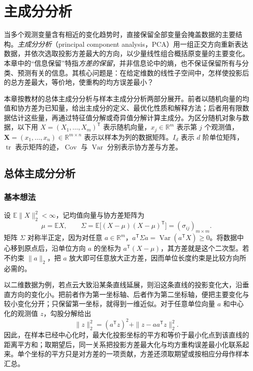\setcounter{chapter}{15} %
\chapter{主成分分析}
\label{ch:lh-pca}

当多个观测变量含有相近的变化趋势时，直接保留全部变量会掩盖数据的主要结构。\emph{主成分分析}（principal component analysis，PCA）用一组正交方向重新表达数据，并依次选取投影方差最大的方向，以少量线性组合概括原变量的主要变化。本章中的“信息保留”特指\emph{方差的保留}，并非信息论中的熵，也不保证保留所有与分类、预测有关的信息。其核心问题是：在给定维数的线性子空间中，怎样使投影后的总方差最大，等价地，使重构的均方误差最小？

本章按教材的总体主成分分析与样本主成分分析两部分展开。前者以随机向量的均值和协方差为已知量，给出主成分的定义、最优化性质和解释方法；后者用有限数据估计这些量，再通过特征值分解或奇异值分解计算主成分。为区分随机对象与数据，以下用 $X=(X_1,\ldots,X_m)^{\mathsf T}$ 表示随机向量，$x_j\in\mathbb R^m$ 表示第 $j$ 个观测值，$\mathbf X=(x_1,\ldots,x_n)\in\mathbb R^{m\times n}$ 表示以样本为列的数据矩阵。$I_d$ 表示 $d$ 阶单位矩阵，$\operatorname{tr}$ 表示矩阵的迹，$\operatorname{Cov}$ 与 $\operatorname{Var}$ 分别表示协方差与方差。

\section{总体主成分分析}
\label{sec:lh-pca-population}

\subsection{基本想法}
\label{subsec:lh-pca-idea}

设 $\mathbb E\|X\|_2^2<\infty$，记均值向量与协方差矩阵为
\begin{equation}
\mu=\mathbb E X,\qquad
\Sigma=\mathbb E\bigl[(X-\mu)(X-\mu)^{\mathsf T}\bigr]
=(\sigma_{ij})_{m\times m}.
\label{eq:lh-pca-population-cov}
\end{equation}
矩阵 $\Sigma$ 对称半正定，因为对任意 $a\in\mathbb R^m$，$a^{\mathsf T}\Sigma a=\operatorname{Var}(a^{\mathsf T}X)\geq0$。将数据中心移到原点后，沿单位方向 $a$ 的坐标为 $a^{\mathsf T}(X-\mu)$，其方差就是这个二次型。若不约束 $\|a\|_2$，把 $a$ 放大即可任意放大正方差，因而单位长度约束是比较方向所必需的。

以二维数据为例，若点云大致沿某条直线延展，则沿这条直线的投影变化大，沿垂直方向的变化小。把前者作为第一坐标轴、后者作为第二坐标轴，便把主要变化与较小变化分开；只保留第一坐标，就得到一维近似。对于任意单位向量 $a$ 和中心化的观测值 $z$，勾股分解给出
\begin{equation}
\|z\|_2^2=(a^{\mathsf T}z)^2
+\|z-aa^{\mathsf T}z\|_2^2.
\label{eq:lh-pca-pythagoras}
\end{equation}
因此，在样本已经中心化时，最大化投影坐标的平方和等价于最小化点到该直线的距离平方和；取期望后，同一关系把投影方差最大化与均方重构误差最小化联系起来。单个坐标的平方只是对方差的一项贡献，方差还须取期望或按相应分母作样本汇总。

